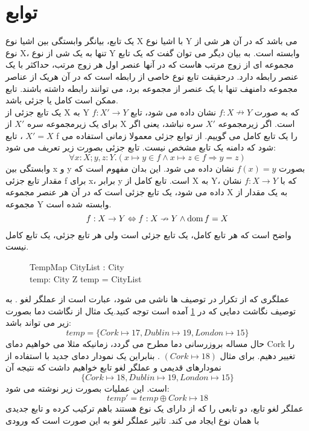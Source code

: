 \section{توابع}
یک تابع، بیانگر وابستگی بین اشیا نوع X با اشیا نوع Y می باشد که در آن هر شی از نوع X، تنها به یک شی از نوع Y وابسته است. به بیان دیگر می توان گفت که یک تابع مجموعه ای از زوج مرتب هاست که در آنها عنصر اول هر زوج مرتب، حداکثر با یک عنصر رابطه دارد. درحقیقت تابع نوع خاصی از رابطه است که در آن هریک از عناصر مجموعه دامنهف تنها با یک عنصر از مجموعه برد، می توانند رابطه داشته باشند. تابع ممکن است کامل یا جزئی باشد.
\\
یک تابع جزئی از X به Y که به صورت
$ f: X\nrightarrow Y$
نشان داده می شود، تابع 
$f: X' \longrightarrow Y$
برای یک زیرمجموعه سره $X'$ از X است. اگر زیرمجموعه $X'$ سره نباشد، یعنی اگر $X'=X$ 
، تابع f را یک تابع کامل می گوییم. از توابع جزئی معمولا زمانی استفاده می شود که دامنه یک تابع مشخص نیست.
تابع جزئی بصورت زیر تعریف می شود:
\[
\forall x:X ; y,z: Y . (x\longmapsto y \in f\wedge x \longmapsto z \in f \Rightarrow y=z)
\]
وابستگی بین x و y بصورت  $f(x)=y$ نشان داده می شود. این بدان مفهوم است که مقدار تابع جزئی f برای x، برابر y است. تابع کامل از X به Y، که با $f: X\rightarrow Y$ نشان داده می شود، یک تابع جزئی است که در آن هر عنصر مجموعه X به یک مقدار از مجموعه Y وابسته شده است.
\[
f: X \rightarrow Y \Leftrightarrow f: X\nrightarrow Y \wedge \mathop{\mathstrut{\mbox{\textrm{dom}}}}\nolimits f=X
\]
واضح است که هر تابع کامل، یک تابع جزئی است ولی هر تابع جزئی، یک تابع کامل نیست.
\begin{figure}
\centering
\begin{schema}{TempMap}
CityList : \pset City
\\
temp: City \nrightarrow Z
\ST
\dom temp = CityList
\end{schema}
\label{TempMap}
\end{figure}
عملگری که از تکرار در توصیف ها ناشی می شود، عبارت است از عملگر لغو
. به توصیف نگاشت دمایی که در 
\ref{TempMap}
 آمده است توجه کنید.یک مثال از نگاشت دما بصورت زیر می تواند باشد:
\[
 temp= \{ Cork \mapsto 17, Dublin \mapsto 19, London \mapsto 15\}
\]
حال مساله بروزرسانی دما مطرح می گردد، زمانیکه مثلا می خواهیم دمای Cork را تغییر دهیم. برای مثال
$(Cork \mapsto 18)$
.
بنابراین یک نمودار دمای جدید با استفاده از نمودارهای قدیمی و عملگر لغو تابع خواهیم داشت که نتیجه آن 
\[
\{ Cork \mapsto 18, Dublin \mapsto 19, London \mapsto 15\}
\]
است. این عملیات بصورت زیر نوشته می شود:
\[
temp' = temp \oplus {Cork \mapsto 18}
\]
عملگر لغو تابع، دو تابعی را که از دارای یک نوع هستند باهم ترکیب کرده و تابع جدیدی با همان نوع ایجاد می کند. تاثیر عملگر لغو به این صورت است که ورودی
